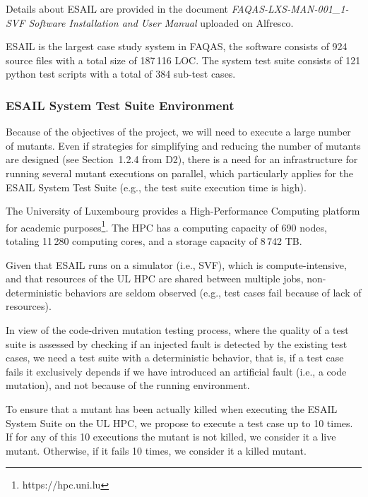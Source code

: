 Details about ESAIL are provided in the document \emph{FAQAS-LXS-MAN-001\_1- SVF Software Installation and User Manual} uploaded on Alfresco.

ESAIL is the largest case study system in FAQAS, the software consists of 924 source files with a total size of 187\,116 LOC. The system test suite consists of 121 python test scripts with a total of 384 sub-test cases. 

\subsubsection{ESAIL System Test Suite Environment}

Because of the objectives of the project, we will need to execute a large number of mutants. Even if strategies for simplifying and reducing the number of mutants are designed (see Section~1.2.4 from D2), there is a need for an infrastructure for running several mutant executions on parallel, which particularly applies for the ESAIL System Test Suite (e.g., the test suite execution time is high).

The University of Luxembourg provides a High-Performance Computing platform for academic purposes\footnote{https://hpc.uni.lu}.
The HPC has a computing capacity of 690 nodes, totaling 11\,280 computing cores, and a storage capacity of 8\,742 TB.

Given that ESAIL runs on a simulator (i.e., SVF), which is compute-intensive, and that resources of the UL HPC are shared between multiple jobs, non-deterministic behaviors are seldom observed (e.g., test cases fail because of lack of resources).

In view of the code-driven mutation testing process, where the quality of a test suite is assessed by checking if an injected fault is detected by the existing test cases, we need a test suite with a deterministic behavior, that is, if a test case fails it exclusively depends if we have introduced an artificial fault (i.e., a code mutation), and not because of the running environment.

To ensure that a mutant has been actually killed when executing the ESAIL System Suite on the UL HPC, we propose to execute a test case up to 10 times. If for any of this 10 executions the mutant is not killed, we consider it a live mutant. Otherwise, if it fails 10 times, we consider it a killed mutant.


